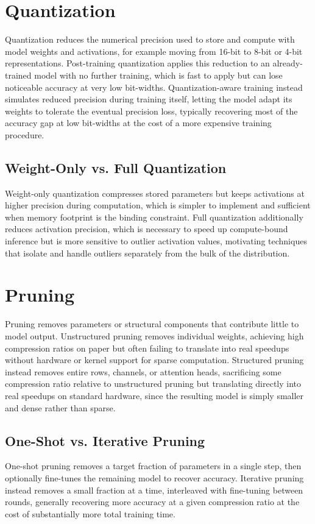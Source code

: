\documentclass[11pt]{article}
\begin{document}
\section{Quantization}
Quantization reduces the numerical precision used to store and compute with model weights and activations, for example moving from 16-bit to 8-bit or 4-bit representations. Post-training quantization applies this reduction to an already-trained model with no further training, which is fast to apply but can lose noticeable accuracy at very low bit-widths. Quantization-aware training instead simulates reduced precision during training itself, letting the model adapt its weights to tolerate the eventual precision loss, typically recovering most of the accuracy gap at low bit-widths at the cost of a more expensive training procedure.

\subsection{Weight-Only vs. Full Quantization}
Weight-only quantization compresses stored parameters but keeps activations at higher precision during computation, which is simpler to implement and sufficient when memory footprint is the binding constraint. Full quantization additionally reduces activation precision, which is necessary to speed up compute-bound inference but is more sensitive to outlier activation values, motivating techniques that isolate and handle outliers separately from the bulk of the distribution.

\section{Pruning}
Pruning removes parameters or structural components that contribute little to model output. Unstructured pruning removes individual weights, achieving high compression ratios on paper but often failing to translate into real speedups without hardware or kernel support for sparse computation. Structured pruning instead removes entire rows, channels, or attention heads, sacrificing some compression ratio relative to unstructured pruning but translating directly into real speedups on standard hardware, since the resulting model is simply smaller and dense rather than sparse.

\subsection{One-Shot vs. Iterative Pruning}
One-shot pruning removes a target fraction of parameters in a single step, then optionally fine-tunes the remaining model to recover accuracy. Iterative pruning instead removes a small fraction at a time, interleaved with fine-tuning between rounds, generally recovering more accuracy at a given compression ratio at the cost of substantially more total training time.
\end{document}
